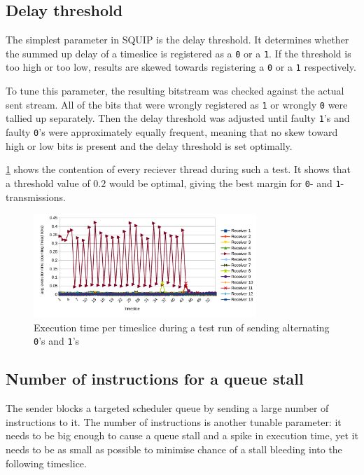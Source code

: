 \documentclass[11pt,
  titlepage=false,
]{scrreprt}
\begin{document}
\subsection{Delay threshold}
The simplest parameter in SQUIP is the delay threshold.
It determines whether the summed up delay of a timeslice is registered as a \texttt{0} or a \texttt{1}.
If the threshold is too high or too low, results are skewed towards registering a \texttt{0} or a \texttt{1} respectively.

To tune this parameter, the resulting bitstream was checked against the actual sent stream.
All of the bits that were wrongly registered as \texttt{1} or wrongly \texttt{0} were tallied up separately.
Then the delay threshold was adjusted until faulty \texttt{1}'s and faulty \texttt{0}'s were approximately equally frequent,
meaning that no skew toward high or low bits is present and the delay threshold is set optimally.

\ref{fig:contentiontest} shows the contention of every reciever thread during such a test.
It shows that a threshold value of $0.2$ would be optimal, giving the best margin for \texttt{0}- and \texttt{1}-transmissions.

\begin{figure}
    \centering
    \includegraphics[width=0.75\textwidth]{figures/contentiontest}

    \caption{Execution time per timeslice during a test run of sending alternating \texttt{0}'s and \texttt{1}'s}
    \label{fig:contentiontest}
\end{figure}

\subsection{Number of instructions for a queue stall}
The sender blocks a targeted scheduler queue by sending a large number of instructions to it.
The number of instructions is another tunable parameter:
it needs to be big enough to cause a queue stall and a spike in execution time,
yet it needs to be as small as possible to minimise chance of a stall bleeding into the following timeslice.
\end{document}
